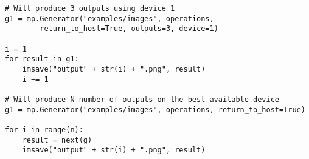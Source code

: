 \begin{description}
\begin{lstlisting}
# Will produce 3 outputs using device 1
g1 = mp.Generator("examples/images", operations, 
        return_to_host=True, outputs=3, device=1)

i = 1
for result in g1:
    imsave("output" + str(i) + ".png", result)
    i += 1
    
# Will produce N number of outputs on the best available device
g1 = mp.Generator("examples/images", operations, return_to_host=True)

for i in range(n):
    result = next(g)
    imsave("output" + str(i) + ".png", result)

\end{lstlisting}
\end{description}
